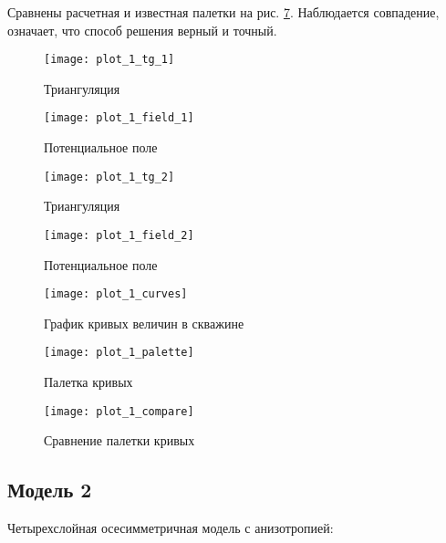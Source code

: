 Сравнены расчетная и известная палетки на рис. \ref{fig:compare_1}. Наблюдается совпадение, означает, что способ решения верный и точный.

\begin{figure}[H]
\centering
\texttt{[image: plot\_1\_tg\_1]}
\caption{Триангуляция}
\label{fig:mesh_1_1}
\end{figure}

\begin{figure}[H]
\centering
\texttt{[image: plot\_1\_field\_1]}
\caption{Потенциальное поле}
\label{fig:field_1_1}
\end{figure}

\begin{figure}[H]
\texttt{[image: plot\_1\_tg\_2]}
\caption{Триангуляция}
\label{fig:mesh_1_2}
\end{figure}

\begin{figure}[H]
\texttt{[image: plot\_1\_field\_2]}
\caption{Потенциальное поле}
\label{fig:field_1_2}
\end{figure}

\begin{figure}[H]
\texttt{[image: plot\_1\_curves]}
\caption{График кривых величин в скважине}
\label{fig:curves_1}
\end{figure}


\begin{figure}[H]
\texttt{[image: plot\_1\_palette]}
\caption{Палетка кривых}
\label{fig:palette_1}
\end{figure}

\begin{figure}[H]
\texttt{[image: plot\_1\_compare]}
\caption{Сравнение палетки кривых}
\label{fig:compare_1}
\end{figure}


\newpage
\subsection{Модель 2}

Четырехслойная осесимметричная модель с анизотропией:

